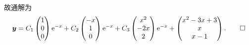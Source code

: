 \begin{solution}
  故通解为
  \[\bm{y} = C_1\begin{pmatrix}1\\0\\0\end{pmatrix}\mathrm{e}^{-x}
    + C_2\begin{pmatrix}-x\\1\\0\end{pmatrix}\mathrm{e}^{-x}
    + C_3\begin{pmatrix}x^2\\-2x\\2\end{pmatrix}\mathrm{e}^{-x}
    + \begin{pmatrix}x^2-3x+3\\x\\x-1\end{pmatrix}.\qedhere\]
\end{solution}



